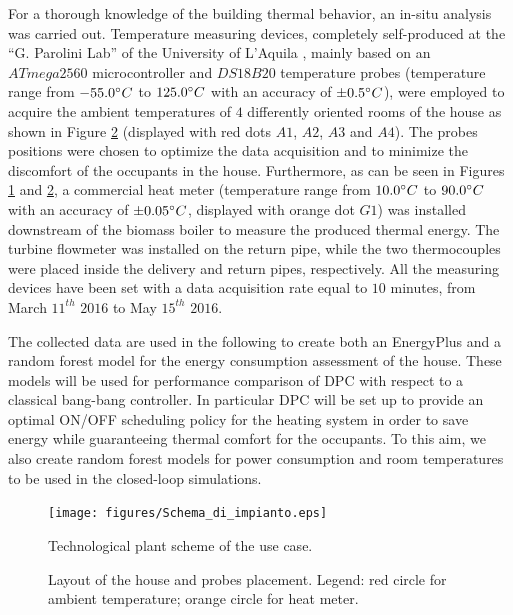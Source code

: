 For a thorough knowledge of the building thermal behavior, an in-situ analysis was carried out. Temperature measuring devices, completely self-produced at the “G. Parolini Lab” of the University of L'Aquila \cite{Pantoli2017}, mainly based on an $ATmega 2560$ microcontroller and $DS18B20$ temperature probes (temperature range from $-55.0\degree C$ to $125.0\degree C$ with an accuracy of $\pm 0.5\degree C$), were employed to acquire the ambient temperatures of $4$ differently oriented rooms of the house as shown in Figure \ref{F:houseFloors} (displayed with red dots $A1$, $A2$, $A3$ and $A4$). The probes positions were chosen to optimize the data acquisition and to minimize the discomfort of the occupants in the house. Furthermore, as can be seen in Figures \ref{F:housePlantScheme} and \ref{F:houseFloors}, a commercial heat meter (temperature range from $10.0\degree C$ to $90.0\degree C$ with an accuracy of $\pm 0.05\degree C$, displayed with orange dot $G1$) was installed downstream of the biomass boiler to measure the produced thermal energy. The turbine flowmeter was installed on the return pipe, while the two thermocouples were placed inside the delivery and return pipes, respectively. All the measuring devices have been set with a data acquisition rate equal to $10$ minutes, from March $11^{th}$ $2016$ to May $15^{th}$ $2016$.

The collected data are used in the following to create both an EnergyPlus and a random forest model for the energy consumption assessment of the house. These models will be used for performance comparison of DPC with respect to a classical bang-bang controller. In particular DPC will be set up to provide an optimal ON/OFF scheduling policy for the heating system in order to save energy while guaranteeing thermal comfort for the occupants. To this aim, we also create random forest models for power consumption and room temperatures to be used in the closed-loop simulations. 

\begin{figure}[t!]
	\begin{center}
		\texttt{[image: figures/Schema\_di\_impianto.eps]}
		\caption{Technological plant scheme of the use case.}
		\captionsetup{justification=centering}
		\label{F:housePlantScheme}
	\end{center}
\end{figure}
\begin{figure}[t!]
	\begin{center}
	\end{center}
	\caption{Layout of the house and probes placement. Legend: red circle for ambient temperature; orange circle for heat meter.}
	\captionsetup{justification=centering}
	\label{F:houseFloors}
\end{figure}
